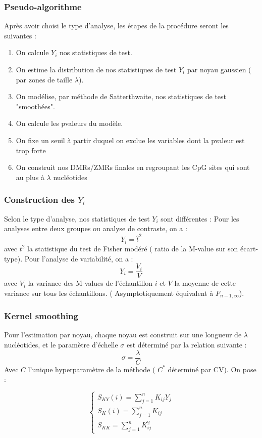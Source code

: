 \documentclass{beamer}
\begin{document}
\begin{frame}
\frametitle{Pseudo-algorithme}
Après avoir choisi le type d'analyse, les étapes de la procédure seront les suivantes :
\begin{enumerate}
\item<2-> On calcule $Y_{i}$ nos statistiques de test.
\item<3-> On estime la distribution de nos statistiques de test $Y_{i}$ par noyau gaussien ( par zones de taille $\lambda$).
\item<4-> On modélise, par méthode de Satterthwaite, nos statistiques de test "smoothées".
\item<5-> On calcule les pvaleurs du modèle.
\item<6-> On fixe un seuil à partir duquel on exclue les variables dont la pvaleur est trop forte
\item<7-> On construit nos DMRs/ZMRs finales en regroupant les CpG sites qui sont au plus à $\lambda$ nucléotides
\end{enumerate}
\end{frame}

\begin{frame}
\frametitle{Construction des $Y_i$}
Selon le type d'analyse, nos statistiques de test $Y_i$ sont différentes :
Pour les analyses entre deux groupes ou analyse de contraste, on a :
$$Y_i = \hat{t}^2$$
avec $t^2$ la statistique du test de Fisher modéré ( ratio de la M-value sur son écart-type).
Pour l'analyse de variabilité, on a :
$$Y_i = \frac{V_i}{V}$$
avec $V_i$ la variance des M-values de l'échantillon $i$ et $V$ la moyenne de cette variance sur tous les échantillons. ( Asymptotiquement équivalent à $F_{n-1,\infty}$).
\end{frame}

\begin{frame}

\frametitle{Kernel smoothing}
Pour l'estimation par noyau,  chaque noyau est construit sur une longueur de $\lambda$ nucléotides, et le paramètre d'échelle $\sigma$ est déterminé par la relation suivante :
$$\sigma = \frac{\lambda}{C}$$
Avec $C$ l'unique hyperparamètre de la méthode ( $C^* $ déterminé par CV). On pose :

\begin{equation}
\left\lbrace
\begin{array}{ccc}
S_{KY}(i) = \sum^n_{j=1}K_{ij}Y_{j} \\
S_{K}(i)= \sum^n_{j=1}K_{ij} \\
S_{KK} = \sum^n_{j=1}K_{ij}^2
\end{array}\right.
\end{equation}



\end{frame}
\end{document}
